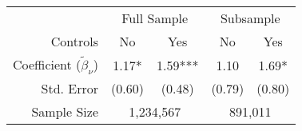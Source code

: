 \documentclass{standalone}
\begin{document}
\begin{tabular}{rcccc}
\toprule 
\midrule 
 & \multicolumn{2}{c}{Full Sample} & \multicolumn{2}{c}{Subsample} \\[5pt]
 \cmidrule(lr){2-3} \cmidrule(lr){4-5} 
Controls & No & Yes & No & Yes \\
\midrule 
Coefficient ($\tilde{\beta}_\nu$) & 1.17* & 1.59*** & 1.10 & 1.69* \\
Std. Error & {\color{blue} (0.60)} & {\color{blue} (0.48)} & {\color{blue} (0.79)} & {\color{blue} (0.80)} \\
\midrule 
Sample Size & \multicolumn{2}{c}{1,234,567} & \multicolumn{2}{c}{891,011} \\
\midrule 
\bottomrule 
\end{tabular}
\end{document}
